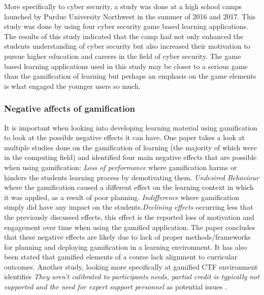 \documentclass[12pt,a4paper]{article}
\begin{document}
More specifically to cyber security, a study was done at a high school camps launched by Purdue University Northwest in the summer of 2016 and 2017\cite{jin2018evaluation}. This study was done by using four cyber security game based learning applications. The results of this study indicated that the camp had not only enhanced the students understanding of cyber security but also increased their motivation to pursue higher education and careers in the field of cyber security. The game based learning applications used in this study may be closer to a serious game than the gamification of learning but perhaps an emphasis on the game elements is what engaged the younger users so much.  

\subsubsection{Negative affects of gamification} 

It is important when looking into developing learning material using gamification to look at the possible negative effects it can have. One paper \cite{toda2017dark} takes a look at multiple studies done on the gamification of learning (the majority of which were in the computing field) and identified four main negative effects that are possible when using gamification: \emph{Loss of performance} where gamification harms or hinders the students learning process by demotivating them. \emph{Undesired Behaviour} where the gamification caused a different effect on the learning context in which it was applied, as a result of poor planning. \emph{Indifference} where gamification simply did have any impact on the students.\emph{Declining effects} occurring less that the previously discussed effects, this effect is the reported loss of motivation and engagement over time when using the gamified application. The paper concludes that these negative effects are likely due to lack of proper methods/frameworks for planning and deploying gamification in a learning environment. It has also been stated that gamified elements of a course lack alignment to curricular outcomes\cite{gonzalez2017cybersecurity}. Another study, looking more specifically at gamified CTF environment identifies \emph{They aren't calibrated to participants needs, partial credit is typically not supported and the need for expert support personnel} as potential issues \cite{katsantonis2017conceptual2}. 
\end{document}
